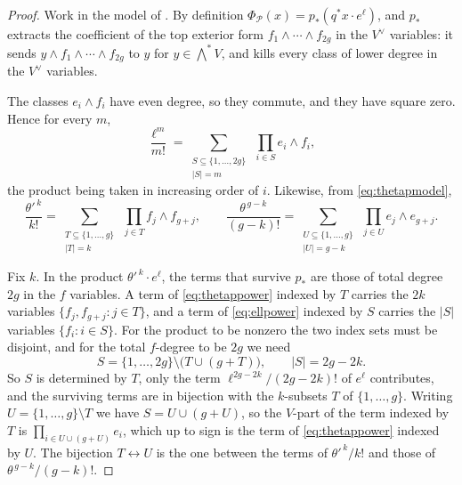 \documentclass[11pt,reqno]{amsart}
\theoremstyle{plain}
\theoremstyle{definition}
\theoremstyle{remark}
\newcommand{\cP}{\mathcal{P}}
\begin{document}
\begin{proof}
Work in the model of . By definition
$\Phi_{\cP}(x)=p_{*}(q^{*}x\cdot e^{\ell})$, and $p_{*}$ extracts the
coefficient of the top exterior form $f_{1}\wedge\cdots\wedge f_{2g}$ in the
$V^{\vee}$ variables: it sends $y\wedge f_{1}\wedge\cdots\wedge f_{2g}$ to
$y$ for $y\in\bigwedge^{*}V$, and kills every class of lower degree in the
$V^{\vee}$ variables.

The classes $e_{i}\wedge f_{i}$ have even degree, so they commute, and they
have square zero. Hence for every $m$,
\begin{equation}\label{eq:ellpower}
  \frac{\ell^{m}}{m!}
  =\sum_{\substack{S\subseteq\{1,\dots,2g\}\\ |S|=m}}\ \prod_{i\in S}e_{i}\wedge f_{i},
\end{equation}
the product being taken in increasing order of $i$. Likewise, from
\eqref{eq:thetapmodel},
\begin{equation}\label{eq:thetappower}
  \frac{\theta'^{\,k}}{k!}
  =\sum_{\substack{T\subseteq\{1,\dots,g\}\\ |T|=k}}\ \prod_{j\in T}f_{j}\wedge f_{g+j},
  \qquad
  \frac{\theta^{\,g-k}}{(g-k)!}
  =\sum_{\substack{U\subseteq\{1,\dots,g\}\\ |U|=g-k}}\ \prod_{j\in U}e_{j}\wedge e_{g+j}.
\end{equation}

Fix $k$. In the product $\theta'^{\,k}\cdot e^{\ell}$, the terms that survive
$p_{*}$ are those of total degree $2g$ in the $f$ variables. A term of
\eqref{eq:thetappower} indexed by $T$ carries the $2k$ variables
$\{f_{j},f_{g+j}:j\in T\}$, and a term of \eqref{eq:ellpower} indexed by $S$
carries the $|S|$ variables $\{f_{i}:i\in S\}$. For the product to be nonzero
the two index sets must be disjoint, and for the total $f$-degree to be $2g$
we need
\[
  S=\{1,\dots,2g\}\setminus\bigl(T\cup(g+T)\bigr),
  \qquad |S|=2g-2k .
\]
So $S$ is determined by $T$, only the term $\ell^{2g-2k}/(2g-2k)!$ of
$e^{\ell}$ contributes, and the surviving terms are in bijection with the
$k$-subsets $T$ of $\{1,\dots,g\}$. Writing $U=\{1,\dots,g\}\setminus T$ we
have $S=U\cup(g+U)$, so the $V$-part of the term indexed by $T$ is
$\prod_{i\in U\cup(g+U)}e_{i}$, which up to sign is the term of
\eqref{eq:thetappower} indexed by $U$. The bijection $T\leftrightarrow U$ is
the one between the terms of $\theta'^{\,k}/k!$ and those of
$\theta^{\,g-k}/(g-k)!$.


\end{proof}
\end{document}
